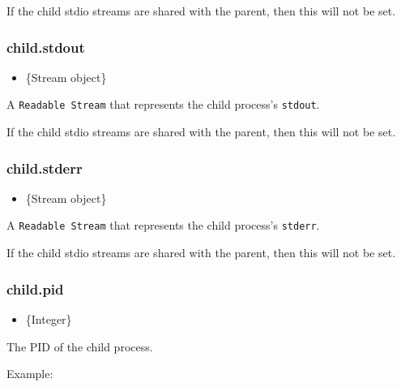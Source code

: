 If the child stdio streams are shared with the parent, then this will
not be set.

\subsubsection{child.stdout}\label{child.stdout}

\begin{itemize}
\itemsep1pt\parskip0pt
\item
  \{Stream object\}
\end{itemize}

A \texttt{Readable Stream} that represents the child process's
\texttt{stdout}.

If the child stdio streams are shared with the parent, then this will
not be set.

\subsubsection{child.stderr}\label{child.stderr}

\begin{itemize}
\itemsep1pt\parskip0pt
\item
  \{Stream object\}
\end{itemize}

A \texttt{Readable Stream} that represents the child process's
\texttt{stderr}.

If the child stdio streams are shared with the parent, then this will
not be set.

\subsubsection{child.pid}\label{child.pid}

\begin{itemize}
\itemsep1pt\parskip0pt
\item
  \{Integer\}
\end{itemize}

The PID of the child process.

Example:

\begin{Shaded}
\begin{Highlighting}[]
 \NormalTok{(}\NormalTok{,}
    \NormalTok{(}\NormalTok{, [}\NormalTok{]);}

\NormalTok{(} \NormalTok{+ }\NormalTok{);}
\NormalTok{();}
\end{Highlighting}
\end{Shaded}


